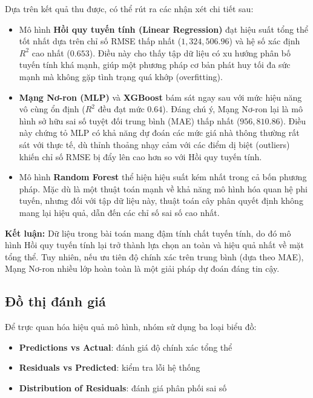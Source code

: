 Dựa trên kết quả thu được, có thể rút ra các nhận xét chi tiết sau:

\begin{itemize}
	\item Mô hình \textbf{Hồi quy tuyến tính (Linear Regression)} đạt hiệu suất tổng thể tốt nhất dựa trên chỉ số RMSE thấp nhất ($1,324,506.96$) và hệ số xác định $R^2$ cao nhất ($0.653$). Điều này cho thấy tập dữ liệu có xu hướng phân bố tuyến tính khá mạnh, giúp một phương pháp cơ bản phát huy tối đa sức mạnh mà không gặp tình trạng quá khớp (overfitting).
	
	\item \textbf{Mạng Nơ-ron (MLP)} và \textbf{XGBoost} bám sát ngay sau với mức hiệu năng vô cùng ổn định ($R^2$ đều đạt mức $0.64$). Đáng chú ý, Mạng Nơ-ron lại là mô hình sở hữu sai số tuyệt đối trung bình (MAE) thấp nhất ($956,810.86$). Điều này chứng tỏ MLP có khả năng dự đoán các mức giá nhà thông thường rất sát với thực tế, dù thỉnh thoảng nhạy cảm với các điểm dị biệt (outliers) khiến chỉ số RMSE bị đẩy lên cao hơn so với Hồi quy tuyến tính.
	
	\item Mô hình \textbf{Random Forest} thể hiện hiệu suất kém nhất trong cả bốn phương pháp. Mặc dù là một thuật toán mạnh về khả năng mô hình hóa quan hệ phi tuyến, nhưng đối với tập dữ liệu này, thuật toán cây phân quyết định không mang lại hiệu quả, dẫn đến các chỉ số sai số cao nhất.
\end{itemize}

\textbf{Kết luận:} Dữ liệu trong bài toán mang đậm tính chất tuyến tính, do đó mô hình Hồi quy tuyến tính lại trở thành lựa chọn an toàn và hiệu quả nhất về mặt tổng thể. Tuy nhiên, nếu ưu tiên độ chính xác trên trung bình (dựa theo MAE), Mạng Nơ-ron nhiều lớp hoàn toàn là một giải pháp dự đoán đáng tin cậy.

\subsection{Đồ thị đánh giá}

Để trực quan hóa hiệu quả mô hình, nhóm sử dụng ba loại biểu đồ:

\begin{itemize}
    \item \textbf{Predictions vs Actual}: đánh giá độ chính xác tổng thể
    \item \textbf{Residuals vs Predicted}: kiểm tra lỗi hệ thống
    \item \textbf{Distribution of Residuals}: đánh giá phân phối sai số
\end{itemize}

